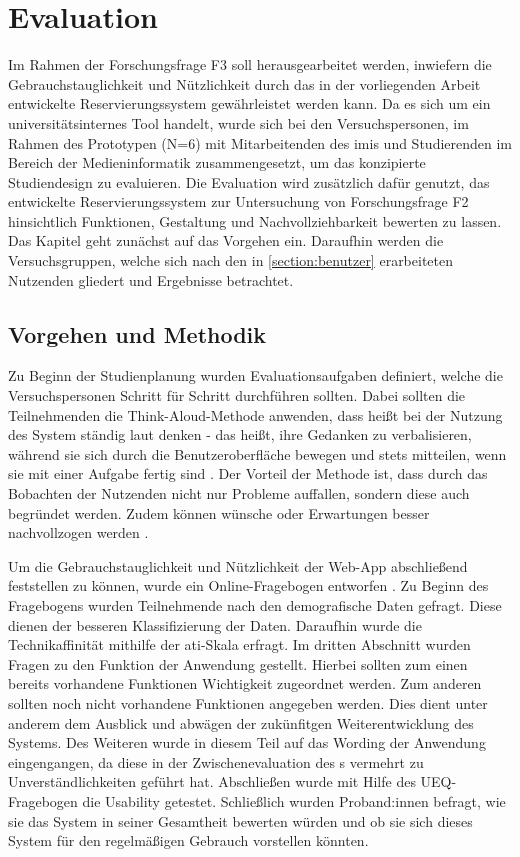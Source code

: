 
\chapter{Evaluation}
\label{chapter-evaluation}
Im Rahmen der Forschungsfrage F3 soll herausgearbeitet werden, inwiefern die
Gebrauchstauglichkeit und Nützlichkeit durch das in der vorliegenden Arbeit
entwickelte Reservierungssystem gewährleistet werden kann. Da es sich um ein
universitätsinternes Tool handelt, wurde sich bei den Versuchspersonen, im
Rahmen des Prototypen (N=6) mit Mitarbeitenden des \ac{imis} und Studierenden im
Bereich der Medieninformatik zusammengesetzt, um das konzipierte Studiendesign
zu evaluieren. Die Evaluation wird zusätzlich dafür genutzt, das entwickelte
Reservierungssystem zur Untersuchung von Forschungsfrage F2 hinsichtlich
Funktionen, Gestaltung und Nachvollziehbarkeit bewerten zu lassen. Das Kapitel
geht zunächst auf das Vorgehen ein. Daraufhin werden die Versuchsgruppen, welche
sich nach den in \ref{section:benutzer} erarbeiteten Nutzenden gliedert und
Ergebnisse betrachtet.


\section{Vorgehen und Methodik}
Zu Beginn der Studienplanung wurden Evaluationsaufgaben definiert, welche die
Versuchspersonen Schritt für Schritt durchführen sollten. Dabei sollten die
Teilnehmenden die Think-Aloud-Methode anwenden, dass heißt bei der Nutzung des
System ständig laut denken - das heißt, ihre Gedanken zu verbalisieren, während
sie sich durch die Benutzeroberfläche bewegen und stets mitteilen, wenn sie mit
einer Aufgabe fertig sind \cite{nielsen_usability_1994}. Der Vorteil der Methode
ist, dass durch das Bobachten der Nutzenden nicht nur Probleme auffallen,
sondern diese auch begründet werden. Zudem können wünsche oder  Erwartungen
besser nachvollzogen werden \cite{nielsen_think}.

Um die Gebrauchstauglichkeit und Nützlichkeit der Web-App abschließend
feststellen zu können, wurde ein Online-Fragebogen entworfen . Zu
Beginn des Fragebogens wurden Teilnehmende nach den demografische Daten gefragt.
Diese dienen der besseren Klassifizierung der Daten. Daraufhin wurde die
Technikaffinität mithilfe der \ac{ati}-Skala erfragt. Im dritten Abschnitt
wurden Fragen zu den Funktion der Anwendung gestellt. Hierbei sollten zum einen
bereits vorhandene Funktionen Wichtigkeit zugeordnet werden. Zum anderen sollten
noch nicht vorhandene Funktionen angegeben werden. Dies dient unter anderem dem
Ausblick und abwägen der zukünfitgen Weiterentwicklung des Systems. Des Weiteren
wurde in diesem Teil auf das Wording der Anwendung eingengangen, da diese in der
Zwischenevaluation des s  vermehrt zu
Unverständlichkeiten geführt hat. Abschließen wurde mit Hilfe des UEQ-Fragebogen
die Usability getestet. Schließlich wurden Proband:innen befragt, wie sie das
System in seiner Gesamtheit bewerten würden und ob sie sich dieses System für
den regelmäßigen Gebrauch vorstellen könnten.




